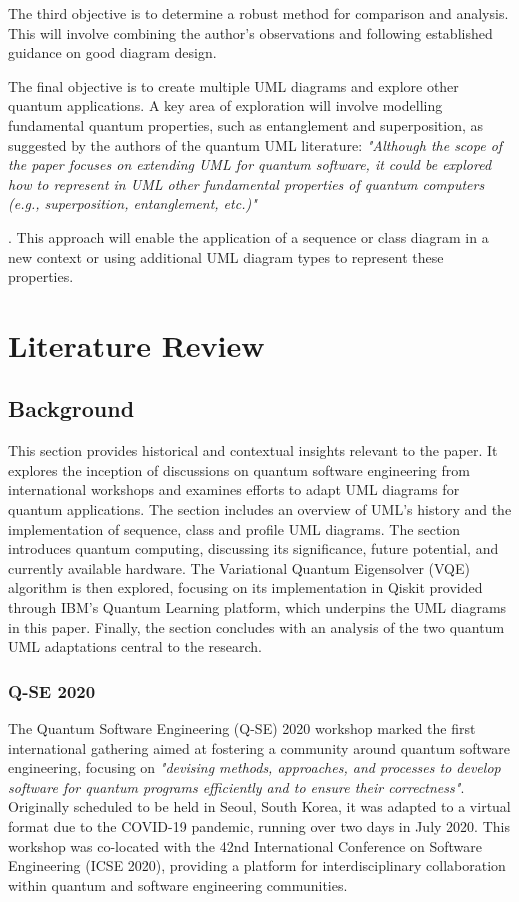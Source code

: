 \documentclass{article}
\begin{document}
The third objective is to determine a robust method for comparison and analysis. This will involve combining the author’s observations and following established guidance on good diagram design.

The final objective is to create multiple UML diagrams and explore other quantum applications. A key area of exploration will involve modelling fundamental quantum properties, such as entanglement and superposition, as suggested by the authors of the quantum UML literature: \textit{"Although the scope of the paper focuses on extending UML for quantum software, it
could be explored how to represent in UML other fundamental properties of quantum
computers (e.g., superposition, entanglement, etc.)"}{\cite{Pérez-Castillo2022}. This approach will enable the application of a sequence or class diagram in a new context or using additional UML diagram types to represent these properties.

\section{Literature Review}

\subsection{Background}

This section provides historical and contextual insights relevant to the paper. It explores the inception of discussions on quantum software engineering from international workshops and examines efforts to adapt UML diagrams for quantum applications. The section includes an overview of UML's history and the implementation of sequence, class and profile UML diagrams. The section introduces quantum computing, discussing its significance, future potential, and currently available hardware. The Variational Quantum Eigensolver (VQE) algorithm is then explored, focusing on its implementation in Qiskit provided through IBM's Quantum Learning platform, which underpins the UML diagrams in this paper. Finally, the section concludes with an analysis of the two quantum UML adaptations central to the research.

\subsubsection{Q-SE 2020}

The Quantum Software Engineering (Q-SE) 2020 workshop marked the first international gathering aimed at fostering a community around quantum software engineering, focusing on \textit{"devising methods, approaches, and processes to develop software for quantum programs efficiently and to ensure their correctness"}\cite{QSE2020}. Originally scheduled to be held in Seoul, South Korea, it was adapted to a virtual format due to the COVID-19 pandemic, running over two days in July 2020. This workshop was co-located with the 42nd International Conference on Software Engineering (ICSE 2020), providing a platform for interdisciplinary collaboration within quantum and software engineering communities.

}
\end{document}
